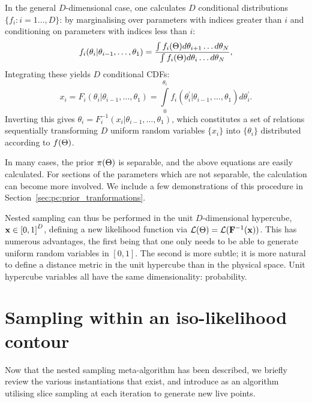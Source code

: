 In the general $D$-dimensional case, one calculates $D$ conditional distributions $\{f_i:i=1\ldots,D\}$: by marginalising over parameters with indices greater than $i$ and conditioning on parameters with indices less than $i$:
%
\begin{equation}
  f_i(\theta_i|\theta_{i-1},\ldots,\theta_1) 
  =
  \frac{%
    \int f_i(\params) d\theta_{i+1}\ldots d\theta_{N}
  }{%
    \int f_i(\params) d\theta_{i}\ldots d\theta_{N}
  },
\end{equation}
%
Integrating these yields $D$ conditional CDFs:
%
\begin{equation}
  x_i = F_i(\theta_i|\theta_{i-1},\ldots,\theta_1) = \int\limits_0^{\theta_i} f_i(\theta_i^\prime|\theta_{i-1},\ldots,\theta_1) d\theta_i^\prime.
\end{equation}
%
Inverting this gives $\theta_i = F^{-1}_i(x_i|\theta_{i-1},\ldots,\theta_1)$, which constitutes a set of relations sequentially transforming $D$ uniform random variables $\{x_i\}$ into $\{\theta_i\}$ distributed according to $f(\Theta)$.

In many cases, the prior $\pi(\Theta)$ is separable, and the above equations are easily calculated. For sections of the parameters which are not separable, the calculation can become more involved. We include a few demonstrations of this procedure in Section~\ref{sec:pc:prior_tranformations}.

Nested sampling can thus be performed in the unit $D$-dimensional hypercube, $\mathbf{x}\in {[0,1]}^D$, defining a new likelihood function via $\mathcal{L}(\Theta)= \mathcal{L}(\mathbf{F}^{-1}(\mathbf{x}))$. This has numerous advantages, the first being that one only needs to be able to generate uniform random variables in $[0,1]$. The second is more subtle; it is more natural to define a distance metric in the unit hypercube than in the physical space. Unit hypercube variables all have the same dimensionality: probability.








\section{Sampling within an iso-likelihood contour}
\label{sec:pc:iso_likelihood_sampling}
Now that the nested sampling meta-algorithm has been described, we briefly review the various instantiations that exist, and introduce \PolyChord{} as an algorithm utilising slice sampling at each iteration to generate new live points.

